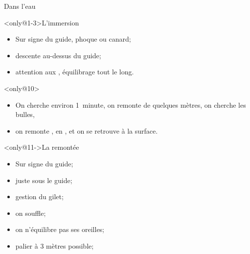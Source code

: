 \begin{frame}{Dans l'eau}
%
\begin{block}<only@1-3>{L'immersion}
\begin{itemize}[<+->]
\item Sur signe du guide, phoque ou canard;
\item descente au-dessus du guide;
\item attention aux , équilibrage tout le long.
\end{itemize}
\end{block}%
%
\begin{block}<only@10>{}
\begin{itemize}
\item On cherche environ 1~minute, on remonte de quelques
  mètres, on cherche les bulles,
\item on remonte , en , et on se retrouve à la
  surface.
\end{itemize}
\end{block}%
\begin{block}<only@11->{La remontée}
\begin{itemize}[<+(7)->]
\item Sur signe du guide;
\item juste sous le guide;
\item gestion du gilet;
\item on souffle;
\item on n'équilibre pas ses oreilles;
\item palier à 3 mètres possible;

\end{itemize}
\end{block}
\end{frame}
